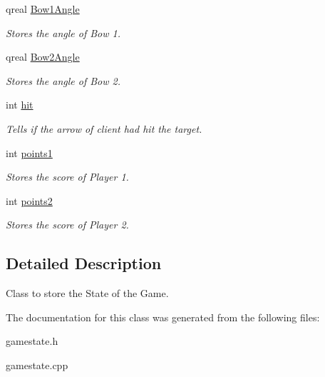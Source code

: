 \begin{DoxyCompactItemize}
\mbox{\label{classgamestate_ad4ce2f0afef6a295020a0939a9ab2679}} 
qreal \hyperlink{classgamestate_ad4ce2f0afef6a295020a0939a9ab2679}{Bow1\+Angle}
\begin{DoxyCompactList}\small\item\em Stores the angle of Bow 1. \end{DoxyCompactList}\item 
\mbox{\label{classgamestate_a6a224fa2eba20bda148712d3a9908e47}} 
qreal \hyperlink{classgamestate_a6a224fa2eba20bda148712d3a9908e47}{Bow2\+Angle}
\begin{DoxyCompactList}\small\item\em Stores the angle of Bow 2. \end{DoxyCompactList}\item 
\mbox{\label{classgamestate_aa278aeddb0187a556914fb50dbca5449}} 
int \hyperlink{classgamestate_aa278aeddb0187a556914fb50dbca5449}{hit}
\begin{DoxyCompactList}\small\item\em Tells if the arrow of client had hit the target. \end{DoxyCompactList}\item 
\mbox{\label{classgamestate_a0101bc9654cb25898514da6e5b614dc2}} 
int \hyperlink{classgamestate_a0101bc9654cb25898514da6e5b614dc2}{points1}
\begin{DoxyCompactList}\small\item\em Stores the score of Player 1. \end{DoxyCompactList}\item 
\mbox{\label{classgamestate_a9fc1884d54b5d42554a784749cad7025}} 
int \hyperlink{classgamestate_a9fc1884d54b5d42554a784749cad7025}{points2}
\begin{DoxyCompactList}\small\item\em Stores the score of Player 2. \end{DoxyCompactList}\end{DoxyCompactItemize}


\subsection{Detailed Description}
Class to store the State of the Game. 

The documentation for this class was generated from the following files\+:\begin{DoxyCompactItemize}
\item 
gamestate.\+h\item 
gamestate.\+cpp\end{DoxyCompactItemize}

